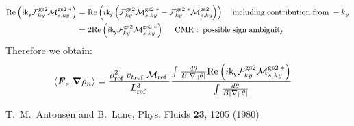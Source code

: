 \documentclass[10pt,a4paper]{article}
\newcommand{\grad}{{\bfm \nabla}}
\newcommand{\bfm}[1]{\mbox{{\boldmath $ { #1}$}}}
\newcommand{\gradpar}{\nabla_{\parallel}}
\newcommand{\n}[1]{{#1}_{\rm ref\;}}
\newcommand{\g}[1]{\mathsf{#1}}
\renewcommand{\Re}[1]{{\rm Re}\left( #1 \right)}
\begin{document}
\begin{align*}
  \Re{ i \g{k_y} {\cal F}^{\rm gs2}_{ky} {\cal M}_{s,ky}^{\rm gs2 \; \ast}} &
  = \Re{i \g{k_y} \left( {\cal F}^{\rm gs2}_{ky} {\cal M}_{s,ky}^{\rm gs2\;
        \ast} - {\cal F}^{\rm gs2\; \ast}_{ky} {\cal M}_{s,ky}^{\rm gs2}
    \right)}
  \;\;\;\;{\rm including \;contribution \; from \;} -k_y \\
  & = 2 \Re {i \g{k_y} {\cal F}^{\rm gs2}_{ky} {\cal M}_{s,ky}^{\rm gs2\;
      \ast}} \;\;\;\;\; {\rm CMR: \;possible \;sign \;ambiguity}
\end{align*}
Therefore we obtain:
\begin{align*}
  \langle \bfm{F}_s.\grad{\rho_n} \rangle & = \frac{\n{\rho}^2 \n{v_t} \n{\cal
      M}}{\n{L}^3 } \frac{\int \frac{d\theta}{B |\gradpar \theta|} \Re {i
      \g{k_y} {\cal F}^{\rm gs2}_{ky} {\cal M}_{s,ky}^{\rm gs2\; \ast}}}{\int
    \frac{d\theta}{B |\gradpar \theta|}}
\end{align*}

\begin{thebibliography}{99}

T.\ M.\ Antonsen and B.\ Lane, Phys. Fluids \textbf{23}, 1205 (1980)

\end{thebibliography}
\end{document}
